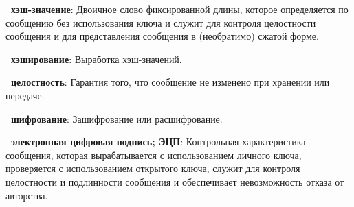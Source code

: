 {\bf \thedefctr~хэш-значение}:
Двоичное слово фиксированной длины, 
которое определяется по сообщению без использования ключа и 
служит для контроля целостности сообщения и для представления 
сообщения в (необратимо) сжатой форме.

{\bf \thedefctr~хэширование}:
Выработка хэш-значений.

{\bf \thedefctr~целостность}:
Гарантия того, что сообщение не изменено 
при хранении или передаче.

{\bf \thedefctr~шифрование}:
Зашифрование или расшифрование.

{\bf \thedefctr~электронная цифровая подпись; ЭЦП}:
Контрольная характеристика сообщения,
которая вырабатывается с использованием личного ключа,
проверяется с использованием открытого ключа,
служит для контроля целостности и подлинности сообщения
и обеспечивает невозможность отказа от авторства.

